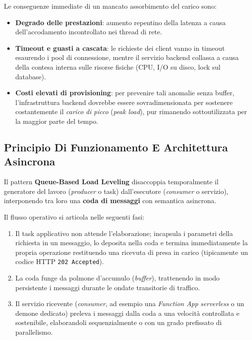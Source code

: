 \documentclass[11pt, a4paper]{article}
\begin{document}
Le conseguenze immediate di un mancato assorbimento del carico sono:
\begin{itemize}[noitemsep]
    \item \textbf{Degrado delle prestazioni}: aumento repentino della latenza a causa dell'accodamento incontrollato nei thread di rete.
    \item \textbf{Timeout e guasti a cascata}: le richieste dei client vanno in timeout esaurendo i pool di connessione, mentre il servizio backend collassa a causa della contesa interna sulle risorse fisiche (CPU, I/O su disco, lock sul database).
    \item \textbf{Costi elevati di provisioning}: per prevenire tali anomalie senza buffer, l'infrastruttura backend dovrebbe essere sovradimensionata per sostenere costantemente il \emph{carico di picco} (\emph{peak load}), pur rimanendo sottoutilizzata per la maggior parte del tempo.
\end{itemize}

\subsection{Principio Di Funzionamento E Architettura Asincrona}

Il pattern \textbf{Queue-Based Load Leveling} disaccoppia temporalmente il generatore del lavoro (\emph{producer} o task) dall'esecutore (\emph{consumer} o servizio), interponendo tra loro una \textbf{coda di messaggi} con semantica asincrona.


Il flusso operativo si articola nelle seguenti fasi:
\begin{enumerate}[noitemsep]
    \item Il task applicativo non attende l'elaborazione; incapsula i parametri della richiesta in un messaggio, lo deposita nella coda e termina immediatamente la propria operazione restituendo una ricevuta di presa in carico (tipicamente un codice HTTP \texttt{202 Accepted}).
    \item La coda funge da polmone d'accumulo (\emph{buffer}), trattenendo in modo persistente i messaggi durante le ondate transitorie di traffico.
    \item Il servizio ricevente (\emph{consumer}, ad esempio una \emph{Function App} \emph{serverless} o un demone dedicato) preleva i messaggi dalla coda a una velocità controllata e sostenibile, elaborandoli sequenzialmente o con un grado prefissato di parallelismo.
\end{enumerate}
\end{document}
